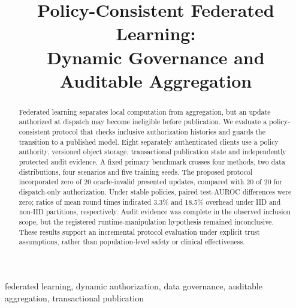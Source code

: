\documentclass[conference,letterpaper]{IEEEtran}
\begin{document}
\title{Policy-Consistent Federated Learning:\\Dynamic Governance and Auditable Aggregation}
\author{
}
\maketitle

\begin{abstract}
Federated learning separates local computation from aggregation, but an update authorized at dispatch may become ineligible before publication. We evaluate a policy-consistent protocol that checks inclusive authorization histories and guards the transition to a published model. Eight separately authenticated clients use a policy authority, versioned object storage, transactional publication state and independently protected audit evidence. A fixed primary benchmark crosses four methods, two data distributions, four scenarios and five training seeds. The proposed protocol incorporated zero of 20 oracle-invalid presented updates, compared with 20 of 20 for dispatch-only authorization. Under stable policies, paired test-AUROC differences were zero; ratios of mean round times indicated 3.3\% and 18.5\% overhead under IID and non-IID partitions, respectively. Audit evidence was complete in the observed inclusion scope, but the registered runtime-manipulation hypothesis remained inconclusive. These results support an incremental protocol evaluation under explicit trust assumptions, rather than population-level safety or clinical effectiveness.
\end{abstract}
\begin{IEEEkeywords}
federated learning, dynamic authorization, data governance, auditable aggregation, transactional publication
\end{IEEEkeywords}
\end{document}
